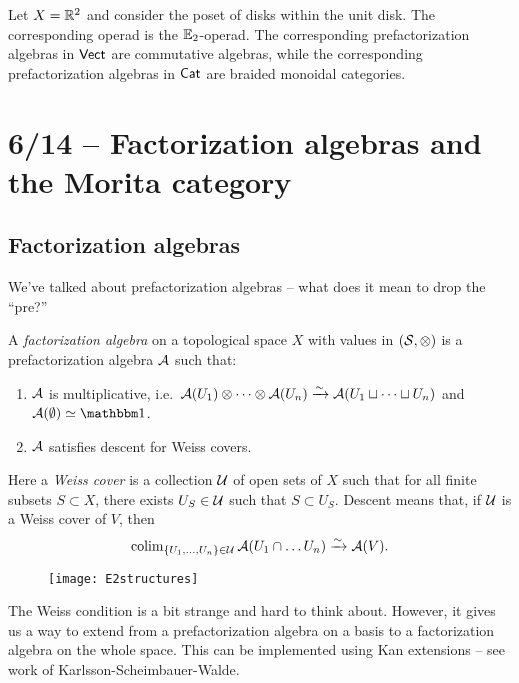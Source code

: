 \begin{ex}
	Let $X = \mathbb{R}^2$ and consider the poset of disks within the unit disk.
	The corresponding operad is the $\mathbb{E}_2$-operad.
	The corresponding prefactorization algebras in $\mathsf{Vect}$ are commutative algebras, while the corresponding prefactorization algebras in $\mathsf{Cat}$ are braided monoidal categories.
\end{ex}

\section{6/14 -- Factorization algebras and the Morita category}

\subsection{Factorization algebras}

We've talked about prefactorization algebras -- what does it mean to drop the ``pre?''

\begin{dfn}
	A \emph{factorization algebra} on a topological space $X$ with values in $(\mathcal{S}, \otimes)$ is a prefactorization algebra $\mathcal{A}$ such that:
	\begin{enumerate}
		\item $\mathcal{A}$ is multiplicative, i.e.\ $\mathcal{A}(U_1) \otimes \dots \otimes \mathcal{A}(U_n) \xrightarrow{\sim} \mathcal{A}(U_1 \sqcup \dots \sqcup U_n)$ and $\Ac(\emptyset) \simeq \onebb$.
		\item $\mathcal{A}$ satisfies descent for Weiss covers.
	\end{enumerate}
	Here a \emph{Weiss cover} is a collection $\mathcal{U}$ of open sets of $X$ such that for all finite subsets $S \subset X$, there exists $U_S \in \mathcal{U}$ such that $S \subset U_S$.
	Descent means that, if $\mathcal{U}$ is a Weiss cover of $V$, then
	\[
		\operatorname{colim}_{\{ U_1, \dots, U_n \} \in \mathcal{U}} \mathcal{A}(U_1 \cap \dots U_n) \xrightarrow{\sim} \mathcal{A}(V).
	\]
\end{dfn}
\begin{figure}[h]
	\centering
	\texttt{[image: E2structures]}
	\label{fig:E2structures}
\end{figure}

The Weiss condition is a bit strange and hard to think about.
However, it gives us a way to extend from a prefactorization algebra on a basis to a factorization algebra on the whole space.
This can be implemented using Kan extensions -- see work of Karlsson-Scheimbauer-Walde.

